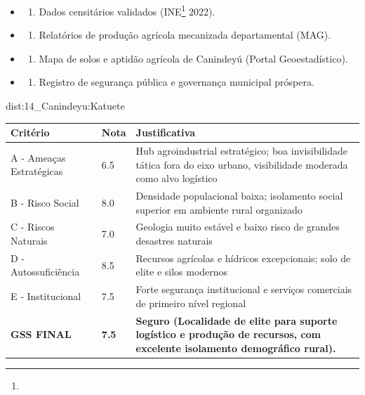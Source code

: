 {\begin{itemize}
\tightlist
\item
  \begin{enumerate}
  \def\labelenumi{\arabic{enumi})}
  \tightlist
  \item
    Dados censitários validados (INE\footnote{\fineINE} 2022).
  \end{enumerate}
\item
  \begin{enumerate}
  \def\labelenumi{\arabic{enumi})}
  \setcounter{enumi}{1}
  \tightlist
  \item
    Relatórios de produção agrícola mecanizada departamental (MAG).
  \end{enumerate}
\item
  \begin{enumerate}
  \def\labelenumi{\arabic{enumi})}
  \setcounter{enumi}{2}
  \tightlist
  \item
    Mapa de solos e aptidão agrícola de Canindeyú (Portal
    Geoestadístico).
  \end{enumerate}
\item
  \begin{enumerate}
  \def\labelenumi{\arabic{enumi})}
  \setcounter{enumi}{3}
  \tightlist
  \item
    Registro de segurança pública e governança municipal próspera.
  \end{enumerate}
\end{itemize}}{dist:14_Canindeyu:Katuete}
\begin{table}[ht!]
\small \begin{tabular}{p{3.0cm}p{0.8cm}p{6.0cm}} \toprule
\textbf{Critério} & \textbf{Nota} & \textbf{Justificativa} \\ \midrule
A - Ameaças Estratégicas & 6.5 & Hub agroindustrial estratégico; boa invisibilidade tática fora do eixo urbano, visibilidade moderada como alvo logístico \\
B - Risco Social & 8.0 & Densidade populacional baixa; isolamento social superior em ambiente rural organizado \\
C - Riscos Naturais & 7.0 & Geologia muito estável e baixo risco de grandes desastres naturais \\
D - Autossuficiência & 8.5 & Recursos agrícolas e hídricos excepcionais; solo de elite e silos modernos \\
E - Institucional & 7.5 & Forte segurança institucional e serviços comerciais de primeiro nível regional \\
\midrule \textbf{GSS FINAL} & \textbf{7.5} & \textbf{Seguro (Localidade de elite para suporte logístico e produção de recursos, com excelente isolamento demográfico rural).} \\ \bottomrule \end{tabular}
\end{table}
